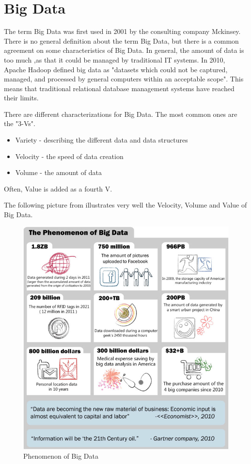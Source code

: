 \documentclass{acm_proc_article-sp}
\begin{document}
\section{Big Data}

The term Big Data was first used in 2001 by the consulting company Mckinsey\cite{DBLP:series/sbcs/ChenMZL14}. There is no general definition about the term Big Data, but there is a common agreement on some characteristics of Big Data. In general, the amount of data is too much ,as that it could be managed by traditional IT systems.
In 2010, Apache Hadoop defined big data as "datasets which could not be
captured, managed, and processed by general computers within an acceptable
scope"\cite{DBLP:series/sbcs/ChenMZL14}. This means that traditional relational database management systems have reached their limits.

There are different characterizations for Big Data. The most common ones are the "3-Vs"\cite{bigdata-challenges}.
\begin{itemize}
	\item Variety - describing the different data and data structures
	\item Velocity - the speed of data creation
	\item Volume - the amount of data
\end{itemize}
Often, Value is added as a fourth V.

The following picture from\cite{DBLP:series/sbcs/ChenMZL14} illustrates very well the Velocity, Volume and Value of Big Data.

\begin{figure}[hbtp]
	\centering
	\includegraphics[scale=0.45]{big_data.png}
	\caption{Phenomenon of Big Data\cite{DBLP:series/sbcs/ChenMZL14}}
\end{figure}
\end{document}
